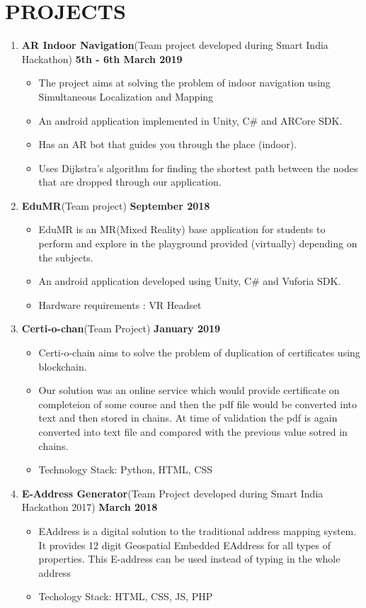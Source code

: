 \documentclass[paper=a4,fontsize=12pt]{scrartcl}
\newcommand{\NewPart}[1]{\section*{\uppercase{#1}}}
\begin{document}
\NewPart{Projects}

\begin{enumerate}
	\item \textbf{AR Indoor Navigation}(Team project developed during Smart India \\ Hackathon) \textbf{5th - 6th March 2019}
    \begin{itemize}
    	\item The project aims at solving the problem of indoor navigation using Simultaneous Localization and Mapping
        \item An android application implemented in Unity, C\# and ARCore SDK.
	 \item Has an AR bot that guides you through the place (indoor).
        \item Uses Dijkstra's algorithm for finding the shortest path between the nodes that are dropped through our application.
    \end{itemize}
   \item \textbf{EduMR}(Team project) \textbf{September 2018}
	\begin{itemize}
	\item EduMR is an MR(Mixed Reality) base application for students to perform and explore in the playground provided (virtually) depending on the subjects.
\item An android application developed using Unity, C\# and Vuforia SDK.
\item Hardware requirements : VR Headset
	\end{itemize}
    \item \textbf{Certi-o-chan}(Team Project) \textbf{January 2019}
\begin{itemize}
\item Certi-o-chain aims to solve the problem of duplication of certificates using blockchain.
\item Our solution was an online service which would provide certificate on completeion of some course and then the pdf file would be converted into text and then stored in chains. At time of validation the pdf is again converted into text file and compared with the previous value sotred in chains.
\item Technology Stack: Python, HTML, CSS
\end{itemize}
    \item \textbf{E-Address Generator}(Team Project developed during Smart India \\ Hackathon 2017) \textbf{March 2018}
\begin{itemize}
\item EAddress is a digital solution to the traditional address mapping system. It
provides 12 digit Geospatial Embedded EAddress for all types of properties.
This E-address can be used instead of typing in the whole address
\item Techology Stack: HTML, CSS, JS, PHP
\end{itemize}


\end{enumerate}
\end{document}
